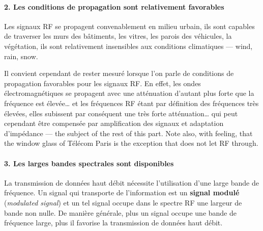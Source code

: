\paragraph{2. Les conditions de propagation sont relativement favorables}
Les signaux RF se propagent convenablement en milieu urbain, ils sont capables
de traverser les murs des bâtiments, les vitres, les parois des véhicules, la
végétation, ils sont relativement insensibles aux conditions climatiques ---
wind, rain, snow.

\begin{remark}
  Il convient cependant de rester mesuré lorsque l'on parle de conditions de
  propagation favorables pour les signaux RF. En effet, les ondes
  électromagnétiques se propagent avec une atténuation d'autant plus forte que
  la fréquence est élevée… et les fréquences RF étant par définition des
  fréquences très élevées, elles subissent par conséquent une très forte
  atténuation… qui peut cependant être compensée par amplification des signaux
  et adaptation d'impédance --- the subject of the rest of this part. Note
  also, with feeling, that the window glass of Télécom Paris is the exception
  that does not let RF through.
\end{remark}

\paragraph{3. Les larges bandes spectrales sont disponibles}
La transmission de données haut débit nécessite l'utilisation d'une large
bande de fréquence. Un signal qui transporte de l'information est un
\textbf{signal modulé} (\textit{modulated signal}) et un tel signal occupe dans
le spectre RF une largeur de bande non nulle. De manière générale, plus un
signal occupe une bande de fréquence large, plus il favorise la transmission de
données haut débit.

